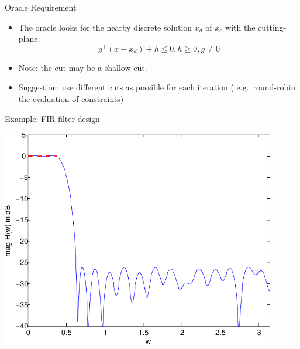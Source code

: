 \documentclass[10pt,ignorenonframetext,serif,onlymath]{beamer}
\begin{document}
\begin{frame}{Oracle Requirement}
\protect\hypertarget{sec:oracle-requirement}{}

\begin{itemize}
\item
  The oracle looks for the nearby discrete solution \(x_d\) of \(x_c\)
  with the cutting-plane:
  \[g^\top (x - x_d) + h \leq 0, h \geq 0, g \neq 0\]
\item
  Note: the cut may be a shallow cut.
\item
  Suggestion: use different cuts as possible for each iteration (
  e.g.~round-robin the evaluation of constraints)
\end{itemize}

\end{frame}

\begin{frame}{Example: FIR filter design}
\protect\hypertarget{sec:example-fir-filter-design-1}{}

\includegraphics[width=0.9\textwidth,height=\textheight]{ellipsoid.files/lowpass_ripple.pdf}

\end{frame}
\end{document}
